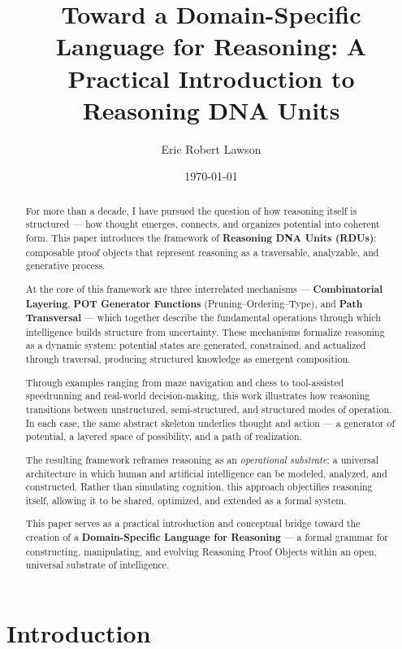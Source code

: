 \documentclass[11pt]{article}
\title{Toward a Domain-Specific Language for Reasoning: A Practical Introduction to Reasoning DNA Units}
\author{Eric Robert Lawson}
\date{\today}
\begin{document}
\maketitle

\begin{abstract}
For more than a decade, I have pursued the question of how reasoning itself is structured — how thought emerges, connects, and organizes potential into coherent form.
This paper introduces the framework of \textbf{Reasoning DNA Units (RDUs)}: composable proof objects that represent reasoning as a traversable, analyzable, and generative process.

At the core of this framework are three interrelated mechanisms — \textbf{Combinatorial Layering}, \textbf{POT Generator Functions} (Pruning–Ordering–Type), and \textbf{Path Transversal} — which together describe the fundamental operations through which intelligence builds structure from uncertainty.
These mechanisms formalize reasoning as a dynamic system: potential states are generated, constrained, and actualized through traversal, producing structured knowledge as emergent composition.

Through examples ranging from maze navigation and chess to tool-assisted speedrunning and real-world decision-making, this work illustrates how reasoning transitions between unstructured, semi-structured, and structured modes of operation.
In each case, the same abstract skeleton underlies thought and action — a generator of potential, a layered space of possibility, and a path of realization.

The resulting framework reframes reasoning as an \textit{operational substrate}: a universal architecture in which human and artificial intelligence can be modeled, analyzed, and constructed.
Rather than simulating cognition, this approach objectifies reasoning itself, allowing it to be shared, optimized, and extended as a formal system.

This paper serves as a practical introduction and conceptual bridge toward the creation of a \textbf{Domain-Specific Language for Reasoning} — a formal grammar for constructing, manipulating, and evolving Reasoning Proof Objects within an open, universal substrate of intelligence.
\end{abstract}

\tableofcontents

\section{Introduction}
\end{document}
